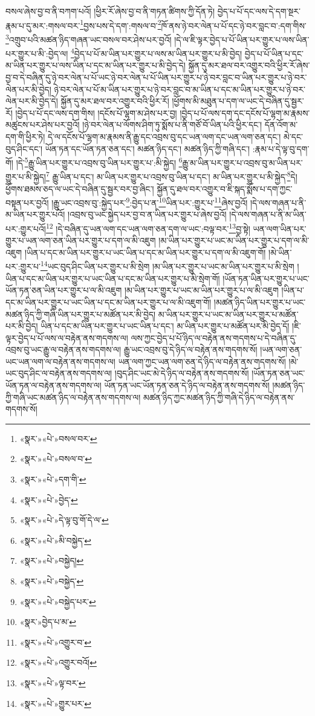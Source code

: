 བསལ་ཞེས་བྱ་བ་ནི་བཀག་པའོ། །ཕྱིར་རོ་ཞེས་བྱ་བ་ནི་གཏན་ཚིགས་ཀྱི་དོན་ཏེ། བྱེད་པ་པོ་དང་ལས་དེ་དག་སྔར་རྣམ་པ་དུ་མར་:གསལ་བར་\footnote{«སྣར་»«པེ་»བསལ་བར་}བྱས་པས་དེ་དག་:གསལ་བ་\footnote{«སྣར་»«པེ་»བསལ་བ་}ཁོ་ནས་ཉེ་བར་ལེན་པ་པོ་དང་ཉེ་བར་བླང་བ་:དག་གིས་\footnote{«སྣར་»«པེ་»དག་གི་}འགྲུབ་པའི་མཚན་ཉིད་གཞན་ཡང་བསལ་བར་ཤེས་པར་བྱའོ། །དེ་ལ་ཇི་ལྟར་བྱེད་པ་པོ་ཡིན་པར་གྱུར་པ་ལས་ཡིན་པར་གྱུར་པ་མི་:བྱེད་ལ། \footnote{«སྣར་»«པེ་»བྱེད་}བྱེད་པ་པོ་མ་ཡིན་པར་གྱུར་པ་ལས་མ་ཡིན་པར་གྱུར་པ་མི་བྱེད། བྱེད་པ་པོ་ཡིན་པ་དང་མ་ཡིན་པར་གྱུར་པ་ལས་ཡིན་པ་དང་མ་ཡིན་པར་གྱུར་པ་མི་བྱེད་དེ། སྐྱོན་དུ་མར་ཐལ་བར་འགྱུར་བའི་ཕྱིར་རོ་ཞེས་བྱ་བ་དེ་བཞིན་དུ་ཉེ་བར་ལེན་པ་པོ་ཡང་ཉེ་བར་ལེན་པ་པོ་ཡིན་པར་གྱུར་པ་ཉེ་བར་བླང་བ་ཡིན་པར་གྱུར་པ་ཉེ་བར་ལེན་པར་མི་བྱེད། ཉེ་བར་ལེན་པ་པོ་མ་ཡིན་པར་གྱུར་པ་ཉེ་བར་བླང་བ་མ་ཡིན་པ་དང་མ་ཡིན་པར་གྱུར་པ་ཉེ་བར་ལེན་པར་མི་བྱེད་དེ། སྐྱོན་དུ་མར་ཐལ་བར་འགྱུར་བའི་ཕྱིར་རོ། །ཕྱོགས་མི་མཐུན་པ་དག་ལ་ཡང་དེ་བཞིན་དུ་སྦྱར་རོ། །བྱེད་པ་པོ་དང་ལས་དག་གིས། །དངོས་པོ་ལྷག་མ་ཤེས་པར་བྱ། །བྱེད་པ་པོ་ལས་དག་དང་དངོས་པོ་ལྷག་མ་རྣམས་མཚུངས་པར་ཤེས་པར་བྱའོ། །ཉེ་བར་ལེན་པ་ལོགས་ཤིག་ཏུ་སྨོས་པ་ནི་གཙོ་བོ་ཡིན་པའི་ཕྱིར་དང་། དོན་འོག་མ་དག་གི་ཕྱིར་ཏེ། དེ་ལ་དངོས་པོ་ལྷག་མ་རྣམས་ནི་རྒྱུ་དང་འབྲས་བུ་དང་ཡན་ལག་དང་ཡན་ལག་ཅན་དང་། མེ་དང་བུད་ཤིང་དང་། ཡོན་ཏན་དང་ཡོན་ཏན་ཅན་དང་། མཚན་ཉིད་དང་། མཚན་ཉིད་ཀྱི་གཞི་དང་། :རྣམ་པ་དེ་ལྟ་བུ་དག་གོ། །དེ་\footnote{«སྣར་»«པེ་»དེ་ལྟ་བུ་གོ་དེ་ལ་}རྒྱུ་ཡིན་པར་གྱུར་པ་འབྲས་བུ་ཡིན་པར་གྱུར་པ་:མི་སྐྱེད། \footnote{«སྣར་»«པེ་»མི་བསྐྱེད་}རྒྱུ་མ་ཡིན་པར་གྱུར་པ་འབྲས་བུ་མ་ཡིན་པར་གྱུར་པ་མི་སྐྱེད།\footnote{«སྣར་»«པེ་»བསྐྱེད།} རྒྱུ་ཡིན་པ་དང་། མ་ཡིན་པར་གྱུར་པ་འབྲས་བུ་ཡིན་པ་དང་། མ་ཡིན་པར་གྱུར་པ་མི་སྐྱེད་\footnote{«སྣར་»«པེ་»བསྐྱེད་}དེ། ཕྱོགས་ཐམས་ཅད་ལ་ཡང་དེ་བཞིན་དུ་སྦྱར་བར་བྱ་ཞིང་། སྐྱོན་དུ་ཐལ་བར་འགྱུར་བ་ཇི་སྐད་སྨོས་པ་དག་ཀྱང་བསྟན་པར་བྱའོ། །རྒྱུ་ཡང་འབྲས་བུ་:སྐྱེད་པར་\footnote{«སྣར་»«པེ་»བསྐྱེད་པར་}:བྱེད་པ་ན་\footnote{«སྣར་»བྱེད་པ་མ་}ཡིན་པར་:གྱུར་པ་\footnote{«སྣར་»«པེ་»འགྱུར་བ་}ཞེས་བྱའོ། །དེ་ལས་གཞན་པ་ནི་མ་ཡིན་པར་གྱུར་པའོ། །འབྲས་བུ་ཡང་སྐྱེད་པར་བྱ་བ་ན་ཡིན་པར་གྱུར་པ་ཞེས་བྱའོ། །དེ་ལས་གཞན་པ་ནི་མ་ཡིན་པར་:གྱུར་པའོ།\footnote{«སྣར་»«པེ་»འགྱུར་བའོ།} །དེ་བཞིན་དུ་ཡན་ལག་དང་ཡན་ལག་ཅན་དག་ལ་ཡང་:བལྟ་བར་\footnote{«སྣར་»«པེ་»ལྟ་བར་}བྱ་སྟེ། ཡན་ལག་ཡིན་པར་གྱུར་པ་ཡན་ལག་ཅན་ཡིན་པར་གྱུར་པ་དག་ལ་མི་འཇུག །མ་ཡིན་པར་གྱུར་པ་ཡང་མ་ཡིན་པར་གྱུར་པ་དག་ལ་མི་འཇུག །ཡིན་པ་དང་མ་ཡིན་པར་གྱུར་པ་ཡང་ཡིན་པ་དང་མ་ཡིན་པར་གྱུར་པ་དག་ལ་མི་འཇུག་གོ། །མེ་ཡིན་པར་:གྱུར་པ་\footnote{«སྣར་»«པེ་»གྱུར་པར་}ཡང་བུད་ཤིང་ཡིན་པར་གྱུར་པ་མི་སྲེག །མ་ཡིན་པར་གྱུར་པ་ཡང་མ་ཡིན་པར་གྱུར་པ་མི་སྲེག །ཡིན་པ་དང་མ་ཡིན་པར་གྱུར་པ་ཡང་ཡིན་པ་དང་མ་ཡིན་པར་གྱུར་པ་མི་སྲེག་གོ། །ཡོན་ཏན་ཡིན་པར་གྱུར་པ་ཡང་ཡོན་ཏན་ཅན་ཡིན་པར་གྱུར་པ་ལ་མི་འཇུག །མ་ཡིན་པར་གྱུར་པ་ཡང་མ་ཡིན་པར་གྱུར་པ་ལ་མི་འཇུག །ཡིན་པ་དང་མ་ཡིན་པར་གྱུར་པ་ཡང་ཡིན་པ་དང་མ་ཡིན་པར་གྱུར་པ་ལ་མི་འཇུག་གོ། །མཚན་ཉིད་ཡིན་པར་གྱུར་པ་ཡང་མཚན་ཉིད་ཀྱི་གཞི་ཡིན་པར་གྱུར་པ་མཚོན་པར་མི་བྱེད། མ་ཡིན་པར་གྱུར་པ་ཡང་མ་ཡིན་པར་གྱུར་པ་མཚོན་པར་མི་བྱེད། ཡིན་པ་དང་མ་ཡིན་པར་གྱུར་པ་ཡང་ཡིན་པ་དང་། མ་ཡིན་པར་གྱུར་པ་མཚོན་པར་མི་བྱེད་དོ། །ཇི་ལྟར་བྱེད་པ་པོ་ལས་ལ་བརྟེན་ནས་གདགས་ལ། ལས་ཀྱང་བྱེད་པ་པོ་ཉིད་ལ་བརྟེན་ནས་གདགས་པ་དེ་བཞིན་དུ་འབྲས་བུ་ཡང་རྒྱུ་ལ་བརྟེན་ནས་གདགས་ལ། རྒྱུ་ཡང་འབྲས་བུ་དེ་ཉིད་ལ་བརྟེན་ནས་གདགས་སོ། །ཡན་ལག་ཅན་ཡང་ཡན་ལག་ལ་བརྟེན་ནས་གདགས་ལ། ཡན་ལག་ཀྱང་ཡན་ལག་ཅན་དེ་ཉིད་ལ་བརྟེན་ནས་གདགས་སོ། །མེ་ཡང་བུད་ཤིང་ལ་བརྟེན་ནས་གདགས་ལ། །བུད་ཤིང་ཡང་མེ་དེ་ཉིད་ལ་བརྟེན་ནས་གདགས་སོ། །ཡོན་ཏན་ཅན་ཡང་ཡོན་ཏན་ལ་བརྟེན་ནས་གདགས་ལ། ཡོན་ཏན་ཡང་ཡོན་ཏན་ཅན་དེ་ཉིད་ལ་བརྟེན་ནས་གདགས་སོ། །མཚན་ཉིད་ཀྱི་གཞི་ཡང་མཚན་ཉིད་ལ་བརྟེན་ནས་གདགས་ལ། མཚན་ཉིད་ཀྱང་མཚན་ཉིད་ཀྱི་གཞི་དེ་ཉིད་ལ་བརྟེན་ནས་གདགས་སོ། 